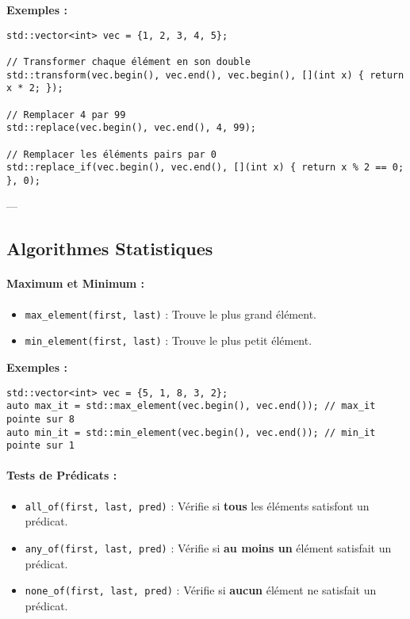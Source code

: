 \textbf{Exemples :}
\begin{tcolorbox}[colframe=blue!50!black, colback=blue!5!white, title=Exemples de Transformation]
\begin{verbatim}
std::vector<int> vec = {1, 2, 3, 4, 5};

// Transformer chaque élément en son double
std::transform(vec.begin(), vec.end(), vec.begin(), [](int x) { return x * 2; });

// Remplacer 4 par 99
std::replace(vec.begin(), vec.end(), 4, 99);

// Remplacer les éléments pairs par 0
std::replace_if(vec.begin(), vec.end(), [](int x) { return x % 2 == 0; }, 0);
\end{verbatim}
\end{tcolorbox}

---

\subsection{ Algorithmes Statistiques}
\paragraph{Maximum et Minimum :}
\begin{itemize}
    \item \texttt{max\_element(first, last)} : Trouve le plus grand élément.
    \item \texttt{min\_element(first, last)} : Trouve le plus petit élément.
\end{itemize}

\textbf{Exemples :}
\begin{tcolorbox}[colframe=blue!50!black, colback=blue!5!white, title=Exemples de Maximum et Minimum]
\begin{verbatim}
std::vector<int> vec = {5, 1, 8, 3, 2};
auto max_it = std::max_element(vec.begin(), vec.end()); // max_it pointe sur 8
auto min_it = std::min_element(vec.begin(), vec.end()); // min_it pointe sur 1
\end{verbatim}
\end{tcolorbox}

\paragraph{Tests de Prédicats :}
\begin{itemize}
    \item \texttt{all\_of(first, last, pred)} : Vérifie si \textbf{tous} les éléments satisfont un prédicat.
    \item \texttt{any\_of(first, last, pred)} : Vérifie si \textbf{au moins un} élément satisfait un prédicat.
    \item \texttt{none\_of(first, last, pred)} : Vérifie si \textbf{aucun} élément ne satisfait un prédicat.
\end{itemize}

